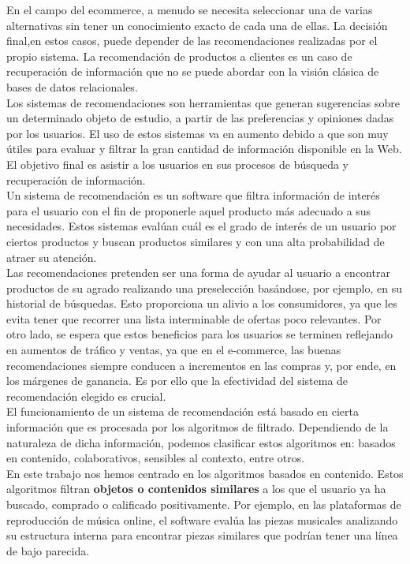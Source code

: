 En el campo del e\-commerce, a menudo se necesita seleccionar una de varias alternativas sin tener un conocimiento exacto de cada una de ellas. La decisi\'on final,en estos casos, puede depender de las recomendaciones realizadas por el propio sistema. La recomendaci\'on de productos a clientes es un caso de recuperaci\'on de informaci\'on que no se puede abordar con la visi\'on cl\'asica de bases de datos relacionales.\\

Los sistemas de recomendaciones son herramientas que generan sugerencias sobre un determinado objeto de estudio, a partir de las preferencias y opiniones dadas por los usuarios. El uso de estos sistemas va en aumento debido a que son muy \'utiles para evaluar y filtrar la gran cantidad  de informaci\'on disponible en la Web. El objetivo final es asistir a los usuarios en sus procesos  de b\'usqueda y recuperaci\'on de informaci\'on.\\
 

Un sistema de recomendaci\'on es un software que filtra informaci\'on de inter\'es para el usuario con el fin de proponerle aquel producto m\'as adecuado a sus necesidades. Estos sistemas eval\'uan cu\'al es el grado de inter\'es de un usuario por ciertos productos y buscan productos similares y con una alta probabilidad de atraer su atenci\'on.\\

Las recomendaciones pretenden ser una forma de ayudar al usuario a encontrar productos de su agrado realizando una preselecci\'on bas\'andose, por ejemplo, en su historial de b\'usquedas. Esto proporciona un alivio a los consumidores, ya que les evita tener que recorrer una lista interminable de ofertas poco relevantes. Por otro lado, se espera que estos beneficios para los usuarios se terminen reflejando en aumentos de tr\'afico y ventas, ya que en el e-commerce, las buenas recomendaciones siempre conducen a incrementos en las compras y, por ende, en los m\'argenes de ganancia. Es por ello que la efectividad del sistema de recomendaci\'on elegido es crucial.\\

El funcionamiento de un sistema de recomendaci\'on est\'a basado en cierta informaci\'on que es procesada por los algoritmos de filtrado. Dependiendo de la naturaleza de dicha informaci\'on, podemos clasificar estos algoritmos en: basados en contenido, colaborativos, sensibles al contexto, entre otros.\\

En este trabajo nos hemos centrado en los algoritmos basados en contenido. Estos algoritmos filtran {\bf objetos o contenidos similares} a los que el usuario ya ha buscado, comprado o calificado positivamente. Por ejemplo, en las plataformas de reproducci\'on de m\'usica online, el software eval\'ua las piezas musicales analizando su estructura interna para encontrar piezas similares que podr\'ian tener una l\'inea de bajo parecida.\\

